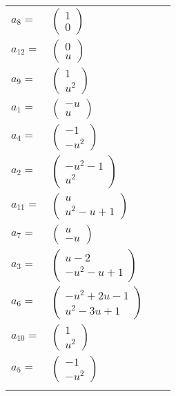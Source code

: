 \documentclass[1p]{elsarticle_modified}
\theoremstyle{definition}
\begin{document}
\begin{tabular}{m{7pt} m{180pt} m{7pt} m{180pt} }
\flushright $a_{8}=$&$\begin{pmatrix}1\\0\end{pmatrix}$ \\
\flushright $a_{12}=$&$\begin{pmatrix}0\\u\end{pmatrix}$ \\
\flushright $a_{9}=$&$\begin{pmatrix}1\\u^2\end{pmatrix}$ \\
\flushright $a_{1}=$&$\begin{pmatrix}- u\\u\end{pmatrix}$ \\
\flushright $a_{4}=$&$\begin{pmatrix}-1\\- u^2\end{pmatrix}$ \\
\flushright $a_{2}=$&$\begin{pmatrix}- u^2-1\\u^2\end{pmatrix}$ \\
\flushright $a_{11}=$&$\begin{pmatrix}u\\u^2- u+1\end{pmatrix}$ \\
\flushright $a_{7}=$&$\begin{pmatrix}u\\- u\end{pmatrix}$ \\
\flushright $a_{3}=$&$\begin{pmatrix}u-2\\- u^2- u+1\end{pmatrix}$ \\
\flushright $a_{6}=$&$\begin{pmatrix}- u^2+2 u-1\\u^2-3 u+1\end{pmatrix}$ \\
\flushright $a_{10}=$&$\begin{pmatrix}1\\u^2\end{pmatrix}$ \\
\flushright $a_{5}=$&$\begin{pmatrix}-1\\- u^2\end{pmatrix}$\\&\end{tabular}
\end{document}

